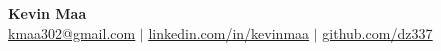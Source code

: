 \documentclass[letterpaper,10pt]{article}
\begin{document}
\begin{center}
    \textbf{\Huge Kevin Maa} \\ \vspace{1pt}
    \small \href{mailto:kmaa302@gmail.com}{\underline{kmaa302@gmail.com}} $|$ 
    \href{https://www.linkedin.com/in/kevinmaa}{\underline{linkedin.com/in/kevinmaa}} $|$
    \href{https://www.github.com/dz337}{\underline{github.com/dz337}}
\end{center}





\end{document}
